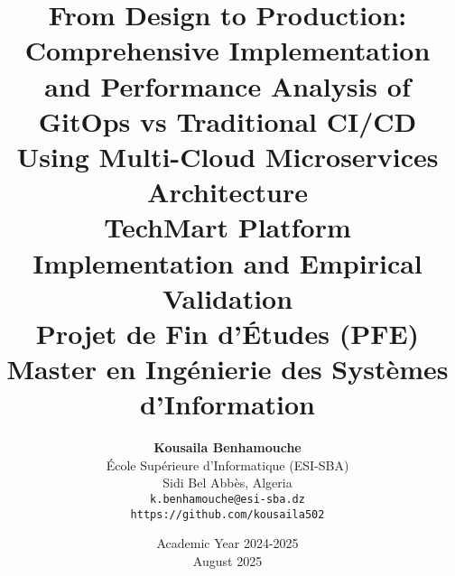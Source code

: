 \documentclass[12pt,a4paper,oneside]{report}
\title{
    \textbf{\Huge From Design to Production: Comprehensive Implementation and Performance Analysis of GitOps vs Traditional CI/CD Using Multi-Cloud Microservices Architecture}\\[0.5cm]
    \Large TechMart Platform Implementation and Empirical Validation\\[1cm]
    \large Projet de Fin d'Études (PFE)\\
    Master en Ingénierie des Systèmes d'Information
}
\author{
    \textbf{Kousaila Benhamouche}\\[0.3cm]
    École Supérieure d'Informatique (ESI-SBA)\\
    Sidi Bel Abbès, Algeria\\[0.5cm]
    \texttt{k.benhamouche@esi-sba.dz}\\
    \texttt{https://github.com/kousaila502}
}
\date{Academic Year 2024-2025\\August 2025}
\begin{document}
\maketitle





\tableofcontents

\listoffigures

\listoftables












\begin{appendices}




\end{appendices}
\end{document}
